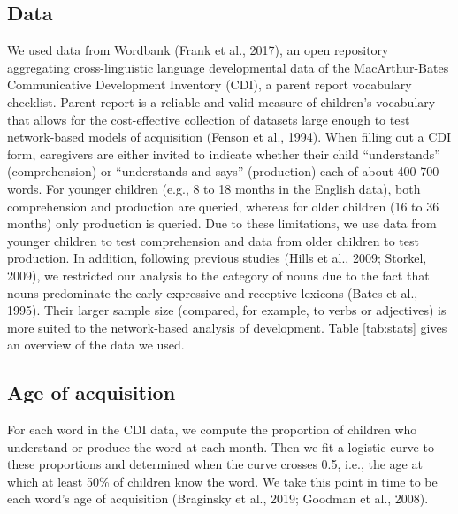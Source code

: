 \documentclass[english,,man,floatsintext]{apa6}
\begin{document}
\hypertarget{data}{%
\subsection{Data}\label{data}}

We used data from Wordbank (Frank et al., 2017), an open repository aggregating cross-linguistic language developmental data of the MacArthur-Bates Communicative Development Inventory (CDI), a parent report vocabulary checklist. Parent report is a reliable and valid measure of children's vocabulary that allows for the cost-effective collection of datasets large enough to test network-based models of acquisition (Fenson et al., 1994). When filling out a CDI form, caregivers are either invited to indicate whether their child \enquote{understands} (comprehension) or \enquote{understands and says} (production) each of about 400-700 words. For younger children (e.g., 8 to 18 months in the English data), both comprehension and production are queried, whereas for older children (16 to 36 months) only production is queried. Due to these limitations, we use data from younger children to test comprehension and data from older children to test production. In addition, following previous studies (Hills et al., 2009; Storkel, 2009), we restricted our analysis to the category of nouns due to the fact that nouns predominate the early expressive and receptive lexicons (Bates et al., 1995). Their larger sample size (compared, for example, to verbs or adjectives) is more suited to the network-based analysis of development. Table \ref{tab:stats} gives an overview of the data we used.

\hypertarget{age-of-acquisition}{%
\subsection{Age of acquisition}\label{age-of-acquisition}}

For each word in the CDI data, we compute the proportion of children who understand or produce the word at each month. Then we fit a logistic curve to these proportions and determined when the curve crosses 0.5, i.e., the age at which at least 50\% of children know the word. We take this point in time to be each word's age of acquisition (Braginsky et al., 2019; Goodman et al., 2008).
\end{document}
